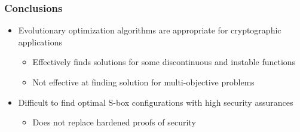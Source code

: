 \documentclass[handout]{beamer}
\begin{document}
\begin{frame}
	\frametitle{Conclusions}
	\begin{itemize}
		\item Evolutionary optimization algorithms are appropriate for cryptographic applications
		\begin{itemize}
			\item Effectively finds solutions for some discontinuous and instable functions
			\item Not effective at finding solution for multi-objective problems
		\end{itemize}
		\item Difficult to find optimal S-box configurations with high security assurances
		\begin{itemize}
			\item Does not replace hardened proofs of security
		\end{itemize}
	\end{itemize}
\end{frame}
\end{document}
